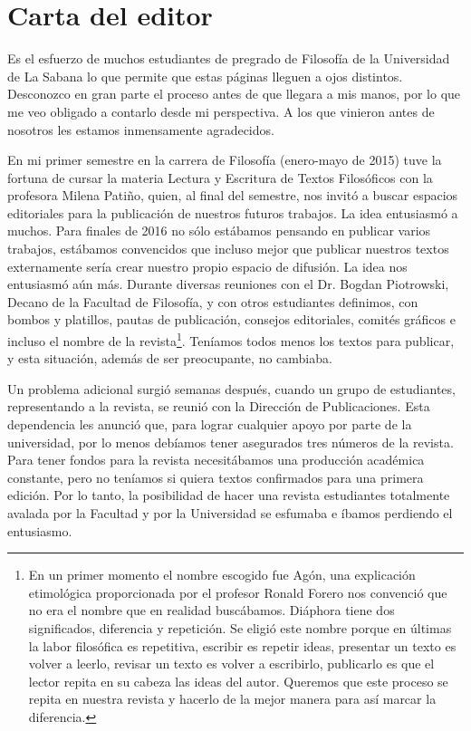 \documentclass[]{book}
\begin{document}
\tableofcontents

\chapter{\texorpdfstring{\textbf{Carta del
editor}}{Carta del editor}}\label{carta-del-editor}

Es el esfuerzo de muchos estudiantes de pregrado de Filosofía de la
Universidad de La Sabana lo que permite que estas páginas lleguen a ojos
distintos. Desconozco en gran parte el proceso antes de que llegara a
mis manos, por lo que me veo obligado a contarlo desde mi perspectiva. A
los que vinieron antes de nosotros les estamos inmensamente agradecidos.

En mi primer semestre en la carrera de Filosofía (enero-mayo de 2015)
tuve la fortuna de cursar la materia Lectura y Escritura de Textos
Filosóficos con la profesora Milena Patiño, quien, al final del
semestre, nos invitó a buscar espacios editoriales para la publicación
de nuestros futuros trabajos. La idea entusiasmó a muchos. Para finales
de 2016 no sólo estábamos pensando en publicar varios trabajos,
estábamos convencidos que incluso mejor que publicar nuestros textos
externamente sería crear nuestro propio espacio de difusión. La idea nos
entusiasmó aún más. Durante diversas reuniones con el Dr. Bogdan
Piotrowski, Decano de la Facultad de Filosofía, y con otros estudiantes
definimos, con bombos y platillos, pautas de publicación, consejos
editoriales, comités gráficos e incluso el nombre de la
revista\footnote{En un primer momento el nombre escogido fue Agón, una
  explicación etimológica proporcionada por el profesor Ronald Forero
  nos convenció que no era el nombre que en realidad buscábamos.
  Diáphora tiene dos significados, diferencia y repetición. Se eligió
  este nombre porque en últimas la labor filosófica es repetitiva,
  escribir es repetir ideas, presentar un texto es volver a leerlo,
  revisar un texto es volver a escribirlo, publicarlo es que el lector
  repita en su cabeza las ideas del autor. Queremos que este proceso se
  repita en nuestra revista y hacerlo de la mejor manera para así marcar
  la diferencia.}. Teníamos todos menos los textos para publicar, y esta
situación, además de ser preocupante, no cambiaba.

Un problema adicional surgió semanas después, cuando un grupo de
estudiantes, representando a la revista, se reunió con la Dirección de
Publicaciones. Esta dependencia les anunció que, para lograr cualquier
apoyo por parte de la universidad, por lo menos debíamos tener
asegurados tres números de la revista. Para tener fondos para la revista
necesitábamos una producción académica constante, pero no teníamos si
quiera textos confirmados para una primera edición. Por lo tanto, la
posibilidad de hacer una revista estudiantes totalmente avalada por la
Facultad y por la Universidad se esfumaba e íbamos perdiendo el
entusiasmo.
\end{document}
